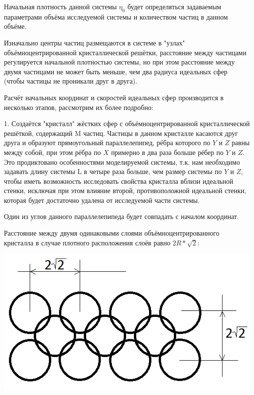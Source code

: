 \documentclass[a4paper]{article}
\begin{document}
Начальная плотность данной системы $ \eta_0 $ будет определяться задаваемым параметрами объёма исследуемой системы и количеством частиц в данном объёме.

Изначально центры частиц размещаются в системе в "узлах" объёмноцентрированной кристаллической решётки, расстояние между частицами регулируется начальной плотностью системы, но при этом расстояние между двумя частицами не может быть меньше, чем два радиуса идеальных сфер (чтобы частицы не проникали друг в друга).

Расчёт начальных координат и скоростей идеальных сфер производится в несколько этапов, рассмотрим их более подробно:

1. Создаётся "кристалл" жёстких сфер с объёмноцентрированной кристаллической решёткой, содержащий M частиц. Частицы в данном кристалле касаются друг друга и образуют прямоугольный параллелепипед, рёбра которого по $ Y $ и $ Z $ равны между собой, при этом рёбра по $ X $ примерно в два раза больше рёбер по $ Y $ и $ Z $. Это продиктовано особенностями моделируемой системы, т.к. нам необходимо задавать длину системы L в четыре раза больше, чем размер системы по $ Y $ и $ Z $, чтобы иметь возможность исследовать свойства кристалла вблизи идеальной стенки, исключая при этом влияние второй, противоположной идеальной стенки, которая будет достаточно удалена от исследуемой части системы.

Один из углов данного параллелепипеда будет совпадать с началом координат.

Расстояние между двумя одинаковыми слоями объёмноцентрированного кристалла в случае плотного расположения слоёв равно $ 2R*\sqrt{2} $:

\begin{center}
\includegraphics[scale=0.5]{distance_between_particles.png}
\end{center}
\end{document}
